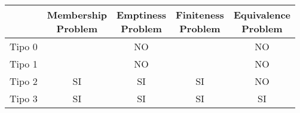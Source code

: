 \documentclass{subfiles}
\begin{document}
\begin{center}
    \begin{tabular}{|c|c|c|c|c|}
        \hline
               & \makecell*{Membership                \\ Problem} & \makecell*{Emptiness \\ Problem} & \makecell*{Finiteness \\ Problem} & \makecell*{Equivalence \\ Problem} \\
        \hline
        Tipo 0 &                       & NO &    & NO \\
        Tipo 1 &                       & NO &    & NO \\
        Tipo 2 & SI                    & SI & SI & NO \\
        Tipo 3 & SI                    & SI & SI & SI \\
        \hline
    \end{tabular}
\end{center}
\end{document}
